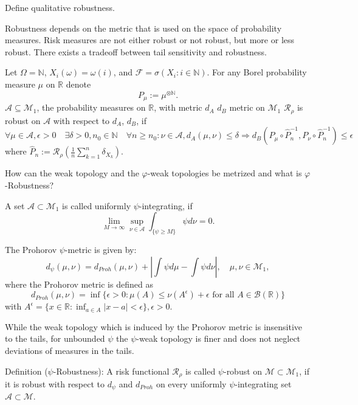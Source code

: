 Define qualitative robustness.

Robustness depends on the metric that is used on the space of probability measures.
Risk measures are not either robust or not robust, but more or less robust.
There exists a tradeoff between tail sensitivity and robustness.

Let \(\Omega = \mathbb{N}\), \(X_i(\omega) = \omega(i)\), and \(\mathcal{F} = \sigma(X_i : i \in \mathbb{N})\).
For any Borel probability measure \(\mu\) on \(\mathbb{R}\) denote
\[P_{\mu} := \mu^{\otimes \mathbb{N}}.\]
\(\mathcal{A} \subseteq \mathcal{M}_1\), the probability measures on \(\mathbb{R}\), with metric \(d_A\)
\(d_B\) metric on \(\mathcal{M}_1\)
\(\mathcal{R}_{\rho}\) is robust on \(\mathcal{A}\) with respect to \(d_A\), \(d_B\), if
\[\forall \mu \in \mathcal{A}, \epsilon > 0 \quad \exists \delta > 0, n_0 \in \mathbb{N} \quad \forall n \geq n_0: \nu \in \mathcal{A}, d_A(\mu, \nu) \leq \delta \Rightarrow d_B(P_{\mu} \circ \hat{P}_n^{-1}, P_{\nu} \circ \hat{P}_n^{-1}) \leq \epsilon\]
where \(\hat{P}_n := \mathcal{R}_{\rho}(\frac{1}{n} \sum_{k=1}^n \delta_{X_k})\).

How can the weak topology and the \( \varphi \)-weak topologies be metrized
and what is \( \varphi \)-Robustness?

A set \(\mathcal{A} \subset \mathcal{M}_1\) is called uniformly \(\psi\)-integrating, if
\[\lim_{M \rightarrow \infty} \sup_{\nu \in \mathcal{A}} \int_{\{\psi \geq M\}} \psi d\nu = 0.\]

The Prohorov \(\psi\)-metric is given by:
\[d_{\psi}(\mu, \nu) = d_{Proh}(\mu, \nu) + \left| \int \psi d\mu - \int \psi d\nu \right|, \quad \mu, \nu \in \mathcal{M}_1,\]
where the Prohorov metric is defined as
\[d_{Proh}(\mu, \nu) = \inf \{ \epsilon > 0 : \mu(A) \leq \nu(A^{\epsilon}) + \epsilon \text{ for all } A \in \mathcal{B}(\mathbb{R}) \}\]
with \(A^{\epsilon} = \{ x \in \mathbb{R} : \inf_{a \in A} |x-a| < \epsilon \}, \epsilon > 0\).

While the weak topology which is induced by the Prohorov metric is insensitive to the tails, for unbounded \(\psi\) the \(\psi\)-weak 
topology is finer and does not neglect deviations of measures in the tails.

Definition (\(\psi\)-Robustness):
A risk functional \(\mathcal{R}_{\rho}\) is called \(\psi\)-robust on \(\mathcal{M} \subset \mathcal{M}_1\), 
if it is robust with respect to \(d_{\psi}\) and \(d_{Proh}\) on every uniformly \(\psi\)-integrating set \(\mathcal{A} \subset \mathcal{M}\).

